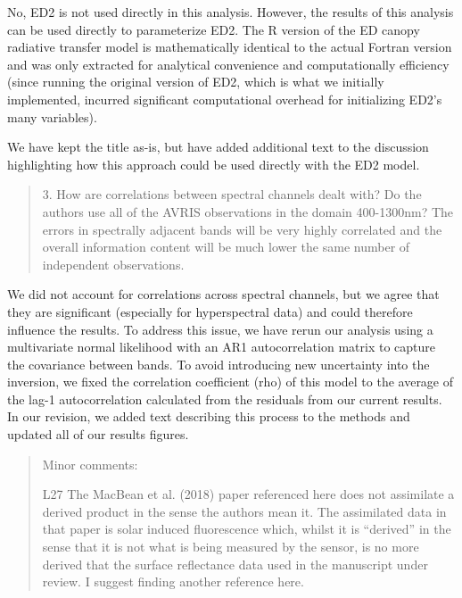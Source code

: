 No, ED2 is not used directly in this analysis. However, the results of this analysis can be used directly to parameterize ED2. The R version of the ED canopy radiative transfer model is mathematically identical to the actual Fortran version and was only extracted for analytical convenience and computationally efficiency (since running the original version of ED2, which is what we initially implemented, incurred significant computational overhead for initializing ED2’s many variables).

We have kept the title as-is, but have added additional text to the discussion highlighting how this approach could be used directly with the ED2 model.


\begin{quote}
  3. How are correlations between spectral channels dealt with? Do the authors use all of the AVRIS observations in the domain 400-1300nm? The errors in spectrally adjacent bands will be very highly correlated and the overall information content will be much lower the same number of independent observations.
\end{quote}

We did not account for correlations across spectral channels, but we agree that they are significant (especially for hyperspectral data) and could therefore influence the results. To address this issue, we have rerun our analysis using a multivariate normal likelihood with an AR1 autocorrelation matrix to capture the covariance between bands. To avoid introducing new uncertainty into the inversion, we fixed the correlation coefficient (rho) of this model to the average of the lag-1 autocorrelation calculated from the residuals from our current results. In our revision, we added text describing this process to the methods and updated all of our results figures.


\begin{quote}
Minor comments:

L27 The MacBean et al. (2018) paper referenced here does not assimilate a derived product in the sense the authors mean it. The assimilated data in that paper is solar induced fluorescence which, whilst it is “derived” in the sense that it is not what is being measured by the sensor, is no more derived that the surface reflectance data used in the manuscript under review. I suggest finding another reference here.
\end{quote}

